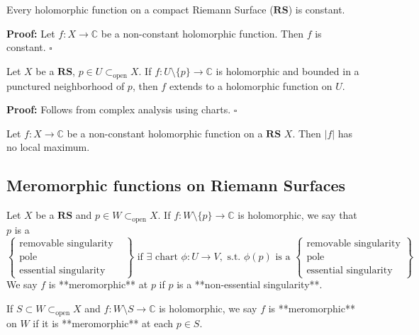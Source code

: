 \documentclass{article}
\begin{document}
\begin{corollary}
Every holomorphic function on a compact Riemann Surface ($\mathbf{RS}$) is constant.
\end{corollary}
\textbf{Proof:}
Let $f: X \to \mathbb{C}$ be a non-constant holomorphic function.
Then $f$ is constant.
\hfill $\square$

\begin{theorem}  
Let $X$ be a $\mathbf{RS}$, $p \in U \subset_{\text{open}} X$. If $f: U \setminus \{p\} \to \mathbb{C}$ is holomorphic and bounded in a punctured neighborhood of $p$, then $f$ extends to a holomorphic function on $U$.
\end{theorem}
\textbf{Proof:}
Follows from complex analysis using charts.
\hfill $\square$

\begin{theorem}  
Let $f: X \to \mathbb{C}$ be a non-constant holomorphic function on a $\mathbf{RS}$ $X$.
Then $|f|$ has no local maximum.
\end{theorem}

\subsection{Meromorphic functions on Riemann Surfaces}

\begin{definition}
Let $X$ be a $\mathbf{RS}$ and $p \in W \subset_{\text{open}} X$. If $f: W \setminus \{p\} \to \mathbb{C}$ is holomorphic, we say that $p$ is a
$$
\left\{
\begin{array}{ll}
\text{removable singularity} & \\
\text{pole} &  \\
\text{essential singularity} & 
\end{array}
\right\}
\text{ if } \exists \text{ chart } \phi: U \to V , \text{ s.t. } \phi(p) \text{ is a }
\left\{
\begin{array}{l}
\text{removable singularity} \\
\text{pole} \\
\text{essential singularity}
\end{array}
\right\}
$$
We say $f$ is **meromorphic** at $p$ if $p$ is a **non-essential singularity**.

If $S \subset W \subset_{\text{open}} X$ and $f: W \setminus S \to \mathbb{C}$ is holomorphic, we say $f$ is **meromorphic** on $W$ if it is **meromorphic** at each $p \in S$.
\end{definition}
\end{document}
